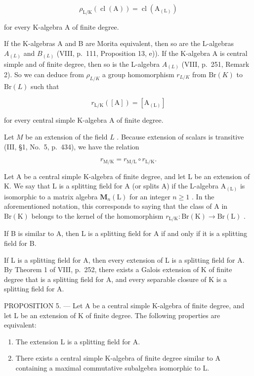 \[
\rho_ {\mathrm{L/K}} (\operatorname{cl} (\mathrm{A})) = \operatorname{cl} (\mathrm{A} _ {(\mathrm{L})})\tag{3}
\]

for every K-algebra A of finite degree.

If the K-algebras A and B are Morita equivalent, then so are the L-algebras \(A_{(L)}\) and \(B_{(L)}\) (VIII, p.~111, Proposition 13, e)). If the K-algebra A is central simple and of finite degree, then so is the L-algebra \(A_{(L)}\) (VIII, p.~251, Remark 2). So we can deduce from \(\rho_{L/K}\) a group homomorphism \(r_{L/K}\) from \(\mathrm{Br}(K)\) to \(\mathrm{Br}(L)\) such that

\[
r _ {\mathrm{L/K}} ([ \mathrm{A} ]) = [ \mathrm{A} _ {(\mathrm{L})} ]\tag{4}
\]

for every central simple K-algebra A of finite degree.

Let \(M\) be an extension of the field \(L\) . Because extension of scalars is transitive (III, §1, No.~5, p.~434), we have the relation

\[
r _ {\mathrm{M/K}} = r _ {\mathrm{M/L}} \circ r _ {\mathrm{L/K}}.\tag{5}
\]

Let A be a central simple K-algebra of finite degree, and let L be an extension of K. We say that L is a splitting field for A (or splits A) if the L-algebra \(\mathrm{A}_{(\mathrm{L})}\) is isomorphic to a matrix algebra \(\mathbf{M}_{n}(\mathrm{L})\) for an integer \(n \geqslant 1\) . In the aforementioned notation, this corresponds to saying that the class of A in \(\mathrm{Br}(\mathrm{K})\) belongs to the kernel of the homomorphism \(r_{\mathrm{L/K}} : \mathrm{Br}(\mathrm{K}) \to \mathrm{Br}(\mathrm{L})\) .

If B is similar to A, then L is a splitting field for A if and only if it is a splitting field for B.

If L is a splitting field for A, then every extension of L is a splitting field for A. By Theorem 1 of VIII, p.~252, there exists a Galois extension of K of finite degree that is a splitting field for A, and every separable closure of K is a splitting field for A.

PROPOSITION 5. --- Let A be a central simple K-algebra of finite degree, and let L be an extension of K of finite degree. The following properties are equivalent:

\begin{enumerate}
\def\labelenumi{(\roman{enumi})}
\item
  The extension L is a splitting field for A.
\item
  There exists a central simple K-algebra of finite degree similar to A containing a maximal commutative subalgebra isomorphic to L.
\end{enumerate}

